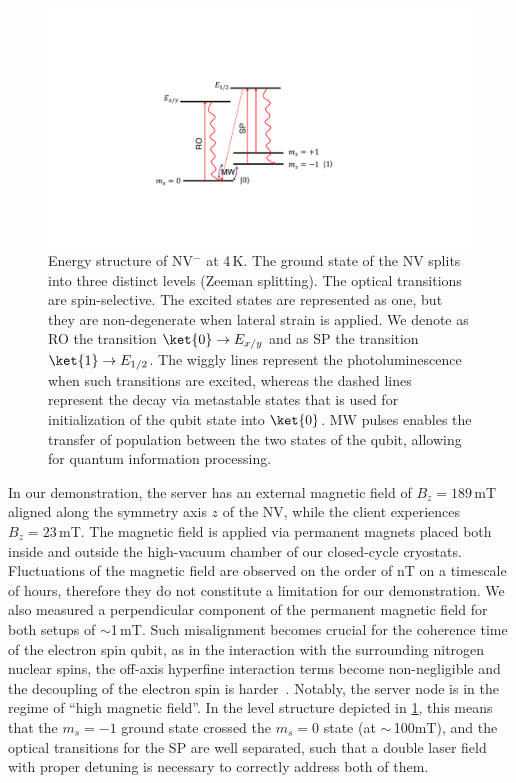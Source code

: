 \begin{figure}
    \centering
    \includegraphics[width=0.8\linewidth]{figures/qnodeos/supplementary/levels_NV.pdf}
    \caption{Energy structure of \ac{NV}$^-$ at 4\,K. The ground state of the \ac{NV} splits into three distinct levels (Zeeman splitting). The optical transitions are spin-selective. The excited states are represented as one, but they are non-degenerate when lateral strain is applied. We denote as \acf{RO} the transition $\ket{0}\rightarrow E_{x/y}$ and as \acf{SP} the transition $\ket{1}\rightarrow E_{1/2}$. The wiggly lines represent the photoluminescence when such transitions are excited, whereas the dashed lines represent the decay via metastable states that is used for initialization of the qubit state into $\ket{0}$. \acf{MW} pulses enables the transfer of population between the two states of the qubit, allowing for quantum information processing.}
    \label{qnodeos:fig:nv_levels}
\end{figure}

In our demonstration, the server has an external magnetic field of $B_z=189$\,mT aligned along the symmetry axis $z$ of the \ac{NV}, while the client experiences $B_z=23$\,mT. The magnetic field is applied via permanent magnets placed both inside and outside the high-vacuum chamber of our closed-cycle cryostats. Fluctuations of the magnetic field are observed on the order of nT on a timescale of hours, therefore they do not constitute a limitation for our demonstration. We also measured a perpendicular component of the permanent magnetic field for both setups of $\sim$1\,mT. Such misalignment becomes crucial for the coherence time of the electron spin qubit, as in the interaction with the surrounding nitrogen nuclear spins, the off-axis hyperfine interaction terms become non-negligible and the decoupling of the electron spin is harder~\cite{doherty_2013}. Notably, the server node is in the regime of ``high magnetic field''. In the level structure depicted in \cref{qnodeos:fig:nv_levels}, this means that the $m_s=-1$ ground state crossed the $m_s=0$ state (at $\sim$\,100mT), and the optical transitions for the \ac{SP} are well separated, such that a double laser field with proper detuning is necessary to correctly address both of them.

